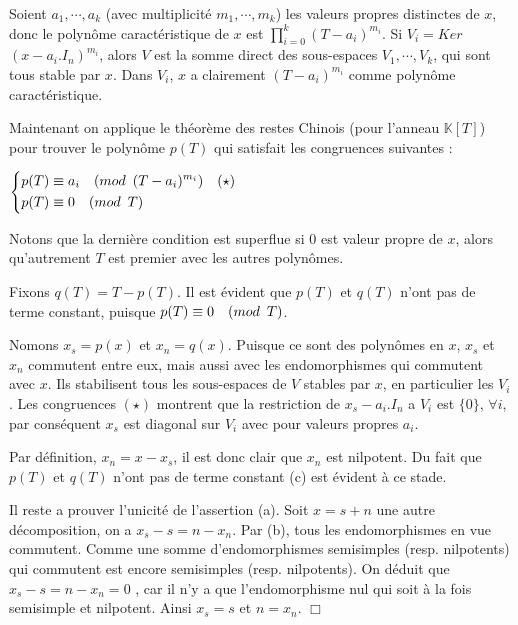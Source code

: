 \documentclass[a4paper,openany,12pt]{report}
\newcommand{\KK}{\mathbb{K}}
\theoremstyle{break}
{\theorembodyfont{\upshape}
\newtheorem*{rmq}{Remarque :}
\newtheorem*{prv}{Preuve :}
\newtheorem*{ex}{Exemples :}
\newtheorem*{exe}{Exemple : }
\newtheorem*{nota}{Notation :}
\newtheorem*{dem}{D\'emonstration :}}
\begin{document}
\begin{prv}
\quad Soient $a_{1},\cdots,a_{k}$ (avec multiplicité $m_{1},\cdots,m_{k}$) les valeurs propres distinctes de $x$, donc le polynôme caractéristique de $x$ est $\prod\limits_{i=0}^k  \left( T-a_{i} \right)^{m_{i}}$. Si $V_{i}=Ker$ $(x-a_{i}.I_{n})^{m_{i}}$, alors $V$ est la somme direct des sous-espaces $V_{1}, \cdots, V_{k}$, qui sont tous stable par $x$. Dans $V_{i}$, $x$ a clairement $(T-a_{i})^{m_{i}}$ comme polynôme caractéristique.

Maintenant on applique le théorème des restes Chinois (pour l'anneau $\KK [T]$) pour trouver le polynôme $p(T)$ qui satisfait les congruences suivantes :
\begin{center}
$
\left\{
\begin{aligned}
p(T) & \equiv a_{i} \quad (mod \enskip (T-a_{i})^{m_{i}}) \quad (\star) \\
p(T) & \equiv 0 \quad (mod \enskip T)
\end{aligned}
\right. $
\end{center}

Notons que la dernière condition est superflue si $0$ est valeur propre de $x$, alors qu'autrement $T$ est premier avec les autres polynômes. 

Fixons $q(T)=T-p(T)$. Il est évident que $p(T)$ et $q(T)$ n'ont pas de terme constant, puisque $p(T) \equiv 0 \quad (mod \enskip T)$.

Nomons $x_{s} = p(x)$ et $x_{n} = q(x)$. Puisque ce sont des polynômes en $x$, $x_{s}$ et $x_{n}$ commutent entre eux, mais aussi avec les endomorphismes qui commutent avec $x$. Ils stabilisent tous les sous-espaces de $V$ stables par $x$, en particulier les $V_{i}$. Les congruences $(\star)$ montrent que la restriction de $x_{s}-a_{i}.I_{n}$ a $V_{i}$ est $\{0\}$, $\forall i$, par conséquent $x_{s}$ est diagonal sur $V_{i}$ avec pour valeurs propres $a_{i}$.

Par définition, $x_{n} = x - x_{s}$, il est donc clair que $x_{n}$ est nilpotent. Du fait que $p(T)$ et $q(T)$ n'ont pas de terme constant (c) est évident à ce stade. 

Il reste a prouver l'unicité de l'assertion (a). Soit $x=s+n$ une autre décomposition, on a $x_{s}-s=n-x_{n}$. Par (b), tous les endomorphismes en vue commutent. Comme une somme d'endomorphismes semisimples (resp. nilpotents) qui commutent est encore semisimples (resp. nilpotents). On déduit que $x_{s}-s=n-x_{n}=0$ , car il n'y a que l'endomorphisme nul qui soit à la fois semisimple et nilpotent. Ainsi $x_{s}=s$ et $n =x_{n}$. $\Box$
\end{prv}
\end{document}
